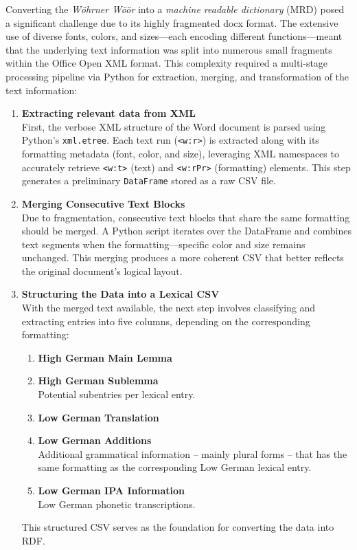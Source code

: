 Converting the \emph{Wöhrner Wöör} into a \emph{machine readable dictionary} (MRD) posed a significant challenge due to its highly fragmented docx format. The extensive use of diverse fonts, colors, and sizes—each encoding different functions—meant that the underlying text information was split into numerous small fragments within the Office Open XML format. This complexity required a multi-stage processing pipeline via Python for extraction, merging, and transformation of the text information:

\begin{enumerate}
    \item \textsf{\textbf{Extracting relevant data from XML}}\\  
    First, the verbose XML structure of the Word document is parsed using Python’s \texttt{xml.etree}. Each text run (\texttt{<w:r>}) is extracted along with its formatting metadata (font, color, and size), leveraging XML namespaces to accurately retrieve \texttt{<w:t>} (text) and \texttt{<w:rPr>} (formatting) elements. This step generates a preliminary \texttt{DataFrame} stored as a raw CSV file.

    \item \textsf{\textbf{Merging Consecutive Text Blocks}}\\  
    Due to fragmentation, consecutive text blocks that share the same formatting should be merged. A Python script iterates over the DataFrame and combines text segments when the formatting—specific color and size remains unchanged. This merging produces a more coherent CSV that better reflects the original document’s logical layout.

    \item \textsf{\textbf{Structuring the Data into a Lexical CSV}}\\  
    With the merged text available, the next step involves classifying and extracting entries into five columns, depending on the corresponding formatting:
    \begin{enumerate}
        \item {\textbf{High German Main Lemma}}
        \item {\textbf{High German Sublemma}}\\Potential subentries per lexical entry.
        \item {\textbf{Low German Translation}}
        \item {\textbf{Low German Additions}}\\ Additional grammatical information -- mainly plural forms -- that has the same formatting as the corresponding Low German lexical entry.
        \item {\textbf{Low German IPA Information}}\\Low German phonetic transcriptions.
    \end{enumerate}
    This structured CSV serves as the foundation for converting the data into RDF.


\end{enumerate}
